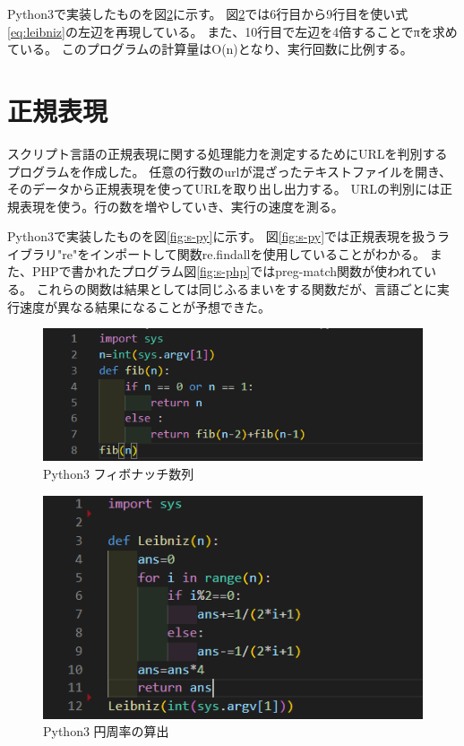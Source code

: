 Python3で実装したものを図\ref{fig:p-py}に示す。
図\ref{fig:p-py}では6行目から9行目を使い式\ref{eq:leibniz}の左辺を再現している。
また、10行目で左辺を4倍することでπを求めている。
このプログラムの計算量はO(n)となり、実行回数に比例する。

\section{正規表現}
スクリプト言語の正規表現に関する処理能力を測定するためにURLを判別するプログラムを作成した。
任意の行数のurlが混ざったテキストファイルを開き、そのデータから正規表現を使ってURLを取り出し出力する。
URLの判別には正規表現を使う。行の数を増やしていき、実行の速度を測る。

Python3で実装したものを図\ref{fig:s-py}に示す。
図\ref{fig:s-py}では正規表現を扱うライブラリ"re"をインポートして関数re.findallを使用していることがわかる。
また、PHPで書かれたプログラム図\ref{fig:s-php}ではpreg-match関数が使われている。
これらの関数は結果としては同じふるまいをする関数だが、言語ごとに実行速度が異なる結果になることが予想できた。

\begin{figure}[tb]
    \centering
    \includegraphics[width=13.5cm,keepaspectratio]{figure/f-py.PNG}
    \caption{Python3 フィボナッチ数列}
    \label{fig:f-py}
\end{figure}

\begin{figure}[tb]
    \centering
    \includegraphics[width=13.5cm,keepaspectratio]{figure/p-py.PNG}
    \caption{Python3 円周率の算出}
    \label{fig:p-py}
\end{figure}

